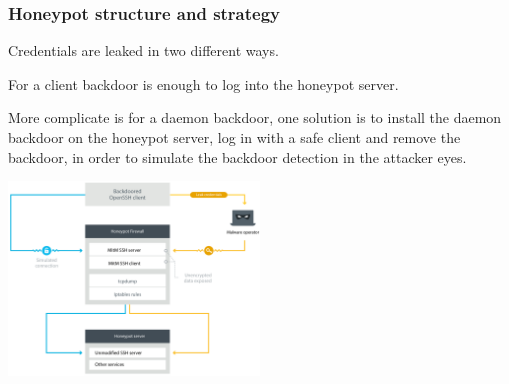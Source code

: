 \begin{frame}
	\frametitle{Honeypot structure and strategy}
	
	\footnotesize
	
  Credentials are leaked in two different ways.
  
  \smallskip

  For a client backdoor is enough to log into the honeypot server. 
  
  \smallskip

  More complicate is for a daemon backdoor, one solution is to install the daemon backdoor on the honeypot server, 
  log in with a safe client and remove the backdoor, in order to simulate the backdoor detection in the attacker eyes.

  \smallskip

  \begin{center}    
  \includegraphics[width=0.5\textwidth]{images/honeypot_infrastructure}
  \end{center}

\end{frame}


